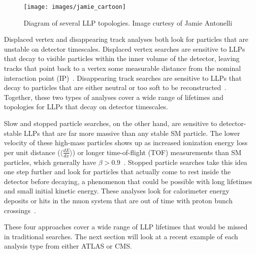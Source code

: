 \documentclass[12pt]{article}
\begin{document}
        \noindent \begin{figure}[htbp] \begin{center}
        \texttt{[image: images/jamie\_cartoon]}
        \caption{Diagram of several LLP topologies. Image curtesy of Jamie Antonelli}
        \label{jamie_cartoon}
        \end{center} \end{figure}

        Displaced vertex and disappearing track analyses both look for particles that are unstable on detector timescales. Displaced vertex searches are sensitive to LLPs that decay to visible particles within the inner volume  of the detector, leaving tracks that point back to a vertex some measurable distance from the nominal interaction point (IP)~\cite{atlas_displaced}. Disappearing track searches are sensitive to LLPs that decay to particles that are either neutral or too soft to be reconstructed~\cite{atlas_disappearing}. Together, these two types of analyses cover a wide range of lifetimes and topologies for LLPs that decay on detector timescales.

        Slow and stopped particle searches, on the other hand, are sensitive to detector-stable LLPs that are far more massive than any stable SM particle. The lower velocity of these high-mass particles shows up as increased ionization energy loss per unit distance ($\langle\frac{dE}{dx}\rangle$) or longer time-of-flight (TOF) measurements than SM particles, which generally have $\beta > \num{0.9}$~\cite{cms_hscp}. Stopped particle searches take this idea one step further and look for particles that actually come to rest inside the detector before decaying, a phenomenon that could be possible with long lifetimes and small initial kinetic energy. These analyses look for calorimeter energy deposits or hits in the muon system that are out of time with proton bunch crossings~\cite{cms_stopped}.

        These four approaches cover a wide range of LLP lifetimes that would be missed in traditional searches. The next section will look  at a recent example of each analysis type from either ATLAS or CMS.
\end{document}

